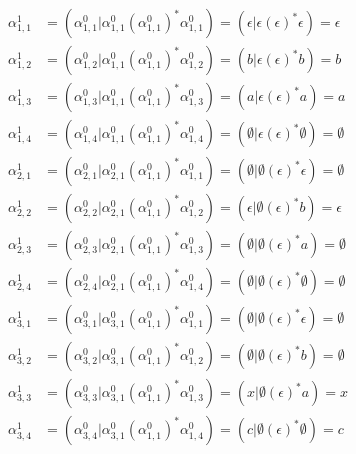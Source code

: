 \documentclass{article}
\begin{document}
\begin{align*}
\alpha^1_{1,1} &= \left(\alpha^0_{1,1}|\alpha^0_{1,1}\left(\alpha^0_{1,1}\right)^*\alpha^0_{1,1}\right) = \left(\epsilon|\epsilon\left(\epsilon\right)^*\epsilon\right) = \epsilon \\
\alpha^1_{1,2} &= \left(\alpha^0_{1,2}|\alpha^0_{1,1}\left(\alpha^0_{1,1}\right)^*\alpha^0_{1,2}\right) = \left(b|\epsilon\left(\epsilon\right)^*b\right) = b \\
\alpha^1_{1,3} &= \left(\alpha^0_{1,3}|\alpha^0_{1,1}\left(\alpha^0_{1,1}\right)^*\alpha^0_{1,3}\right) = \left(a|\epsilon\left(\epsilon\right)^*a\right) = a \\
\alpha^1_{1,4} &= \left(\alpha^0_{1,4}|\alpha^0_{1,1}\left(\alpha^0_{1,1}\right)^*\alpha^0_{1,4}\right) = \left(\emptyset|\epsilon\left(\epsilon\right)^*\emptyset\right) = \emptyset \\
\alpha^1_{2,1} &= \left(\alpha^0_{2,1}|\alpha^0_{2,1}\left(\alpha^0_{1,1}\right)^*\alpha^0_{1,1}\right) = \left(\emptyset|\emptyset\left(\epsilon\right)^*\epsilon\right) = \emptyset \\
\alpha^1_{2,2} &= \left(\alpha^0_{2,2}|\alpha^0_{2,1}\left(\alpha^0_{1,1}\right)^*\alpha^0_{1,2}\right) = \left(\epsilon|\emptyset\left(\epsilon\right)^*b\right) = \epsilon \\
\alpha^1_{2,3} &= \left(\alpha^0_{2,3}|\alpha^0_{2,1}\left(\alpha^0_{1,1}\right)^*\alpha^0_{1,3}\right) = \left(\emptyset|\emptyset\left(\epsilon\right)^*a\right) = \emptyset \\
\alpha^1_{2,4} &= \left(\alpha^0_{2,4}|\alpha^0_{2,1}\left(\alpha^0_{1,1}\right)^*\alpha^0_{1,4}\right) = \left(\emptyset|\emptyset\left(\epsilon\right)^*\emptyset\right) = \emptyset \\
\alpha^1_{3,1} &= \left(\alpha^0_{3,1}|\alpha^0_{3,1}\left(\alpha^0_{1,1}\right)^*\alpha^0_{1,1}\right) = \left(\emptyset|\emptyset\left(\epsilon\right)^*\epsilon\right) = \emptyset \\
\alpha^1_{3,2} &= \left(\alpha^0_{3,2}|\alpha^0_{3,1}\left(\alpha^0_{1,1}\right)^*\alpha^0_{1,2}\right) = \left(\emptyset|\emptyset\left(\epsilon\right)^*b\right) = \emptyset \\
\alpha^1_{3,3} &= \left(\alpha^0_{3,3}|\alpha^0_{3,1}\left(\alpha^0_{1,1}\right)^*\alpha^0_{1,3}\right) = \left(x|\emptyset\left(\epsilon\right)^*a\right) = x \\
\alpha^1_{3,4} &= \left(\alpha^0_{3,4}|\alpha^0_{3,1}\left(\alpha^0_{1,1}\right)^*\alpha^0_{1,4}\right) = \left(c|\emptyset\left(\epsilon\right)^*\emptyset\right) = c \\

\end{align*}
\end{document}
